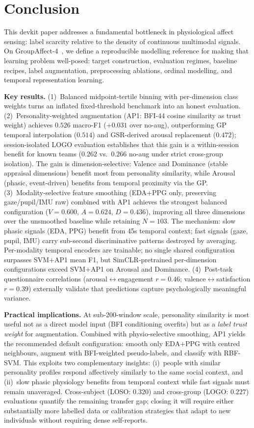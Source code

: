 \documentclass[sigconf,review,anonymous]{acmart}
\begin{document}
\section{Conclusion}
\label{sec:conclusion}

This devkit paper addresses a fundamental bottleneck in physiological affect
sensing: label scarcity relative to the density of continuous multimodal
signals.
On GroupAffect-4~\cite{groupaffect4}, we define a reproducible modelling
reference for making that learning problem well-posed: target construction,
evaluation regimes, baseline recipes, label augmentation, preprocessing
ablations, ordinal modelling, and temporal representation learning.

\textbf{Key results.}
(1)~Balanced midpoint-tertile binning with per-dimension class weights
turns an inflated fixed-threshold benchmark into an honest evaluation.
(2)~Personality-weighted augmentation (AP1: BFI-44 cosine similarity as
trust weight) achieves $0.526$ macro-F1 ($+0.031$ over no-aug),
outperforming GP temporal interpolation ($0.514$) and GSR-derived arousal
replacement ($0.472$); session-isolated LOGO evaluation establishes that
this gain is a within-session benefit for known teams ($0.262$ vs.\ $0.266$
no-aug under strict cross-group isolation).
The gain is dimension-selective: Valence and Dominance (stable appraisal
dimensions) benefit most from personality similarity, while Arousal
(phasic, event-driven) benefits from temporal proximity via the GP.
(3)~Modality-selective feature smoothing (EDA+PPG only, preserving
gaze/pupil/IMU raw) combined with AP1 achieves the strongest balanced
configuration ($V{=}0.600$, $A{=}0.624$, $D{=}0.436$), improving all
three dimensions over the unsmoothed baseline while retaining $N{=}103$.
The mechanism: slow phasic signals (EDA, PPG) benefit from 45s temporal
context; fast signals (gaze, pupil, IMU) carry sub-second discriminative
patterns destroyed by averaging.
Per-modality temporal encoders are trainable; no single shared configuration
surpasses SVM+AP1 mean F1, but SimCLR-pretrained per-dimension configurations
exceed SVM+AP1 on Arousal and Dominance.
(4)~Post-task questionnaire correlations (arousal$\leftrightarrow$engagement
$r{=}0.46$; valence$\leftrightarrow$satisfaction $r{=}0.39$) externally
validate that predictions capture psychologically meaningful variance.

\textbf{Practical implications.}
At sub-200-window scale, personality similarity is most useful not as a
direct model input (BFI conditioning overfits) but as a \emph{label trust
weight} for augmentation.
Combined with physio-selective smoothing, AP1 yields the recommended
default configuration: smooth only EDA+PPG with centred neighbours,
augment with BFI-weighted pseudo-labels, and classify with RBF-SVM.
This exploits two complementary insights: (i)~people with similar
personality profiles respond affectively similarly to the same social
context, and (ii)~slow phasic physiology benefits from temporal context
while fast signals must remain unaveraged.
Cross-subject (LOSO: $0.320$) and cross-group (LOGO: $0.227$) evaluations
quantify the remaining transfer gap; closing it will require either
substantially more labelled data or calibration strategies that adapt to
new individuals without requiring dense self-reports.
\end{document}
